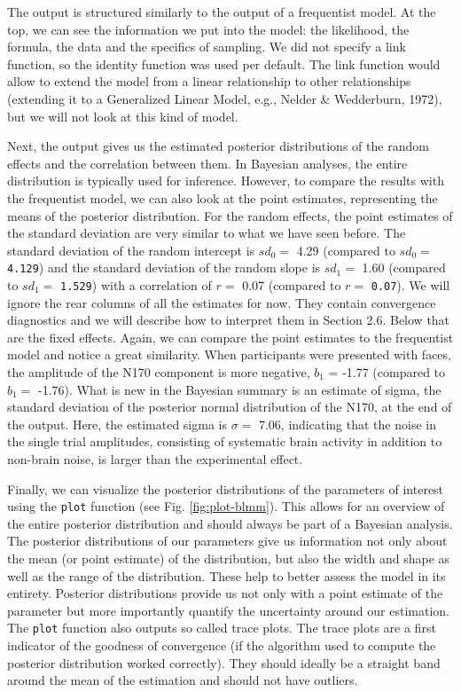 \documentclass[
  doc,12pt,floatsintext]{apa7}
\begin{document}
\normalsize

The output is structured similarly to the output of a frequentist model. At the top, we can see the information we put into the model: the likelihood, the formula, the data and the specifics of sampling. We did not specify a link function, so the identity function was used per default. The link function would allow to extend the model from a linear relationship to other relationships (extending it to a Generalized Linear Model, e.g., Nelder \& Wedderburn, 1972), but we will not look at this kind of model.

Next, the output gives us the estimated posterior distributions of the random effects and the correlation between them. In Bayesian analyses, the entire distribution is typically used for inference. However, to compare the results with the frequentist model, we can also look at the point estimates, representing the means of the posterior distribution. For the random effects, the point estimates of the standard deviation are very similar to what we have seen before. The standard deviation of the random intercept is \(sd_0 =\) 4.29 (compared to \(sd_0 =\) \texttt{4.129}) and the standard deviation of the random slope is \(sd_1 =\) 1.60 (compared to \(sd_1 =\) \texttt{1.529}) with a correlation of \(r =\) 0.07 (compared to \(r =\) \texttt{0.07}). We will ignore the rear columns of all the estimates for now. They contain convergence diagnostics and we will describe how to interpret them in Section 2.6. Below that are the fixed effects. Again, we can compare the point estimates to the frequentist model and notice a great similarity. When participants were presented with faces, the amplitude of the N170 component is more negative, \(b_1\) = -1.77 (compared to \(b_1 =\) -1.76). What is new in the Bayesian summary is an estimate of sigma, the standard deviation of the posterior normal distribution of the N170, at the end of the output. Here, the estimated sigma is \(\sigma =\) 7.06, indicating that the noise in the single trial amplitudes, consisting of systematic brain activity in addition to non-brain noise, is larger than the experimental effect.

Finally, we can visualize the posterior distributions of the parameters of interest using the \texttt{plot} function (see Fig. \ref{fig:plot-blmm}). This allows for an overview of the entire posterior distribution and should always be part of a Bayesian analysis. The posterior distributions of our parameters give us information not only about the mean (or point estimate) of the distribution, but also the width and shape as well as the range of the distribution. These help to better assess the model in its entirety. Posterior distributions provide us not only with a point estimate of the parameter but more importantly quantify the uncertainty around our estimation. The \texttt{plot} function also outputs so called trace plots. The trace plots are a first indicator of the goodness of convergence (if the algorithm used to compute the posterior distribution worked correctly). They should ideally be a straight band around the mean of the estimation and should not have outliers.
\end{document}
